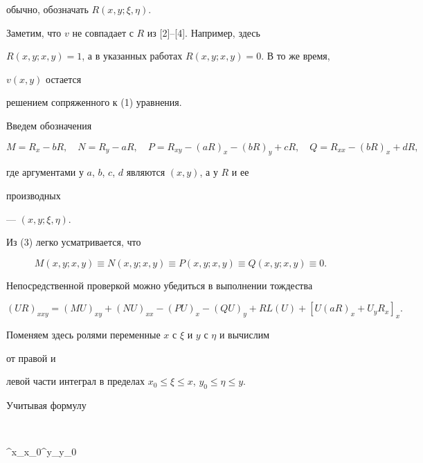 обычно, обозначать $R(x,y;\xi,\eta)$. 


 


Заметим, что $v$ не совпадает с $R$ из [2]--[4]. Например, здесь  


$R(x,y;x,y)=1$, а в указанных работах $R(x,y;x,y)=0$. В то же время, 


$v(x,y)$ остается  


решением сопряженного к (1) уравнения. 


 


Введем обозначения 


\begin{equation} 


M=R_x-b R,\quad N=R_y-a R,\quad P=R_{xy}-(a R)_x- 


(b R)_y+c R,\quad Q=R_{xx}-(b R)_x+d R, 


\end{equation} 


где аргументами у $a$, $b$, $c$, $d$ являются $(x,y)$, а у $R$ и ее 


производных 


--- $(x,y;\xi,\eta)$. 


Из (3) легко усматривается, что  


\begin{equation} 


M(x,y;x,y)\equiv N(x,y;x,y)\equiv 


P(x,y;x,y)\equiv Q(x,y;x,y)\equiv0. 


\end{equation} 


 


Непосредственной проверкой можно убедиться в выполнении тождества 


$$ 


(U R)_{xxy}=(M U)_{xy}+(N U)_{xx}-(P U)_x- 


(Q U)_y+R L(U)+[U(a R)_x+U_y R_x]_x. 


$$ 


Поменяем здесь ролями переменные $x$ с $\xi$ и $y$ с $\eta$ и вычислим 


от правой и 


левой части интеграл в пределах $x_0\le\xi\le x$, $y_0\le\eta\le y$. 


Учитывая формулу 


$$ 


\int^x_{x_0}\int^y_{y_0} 


